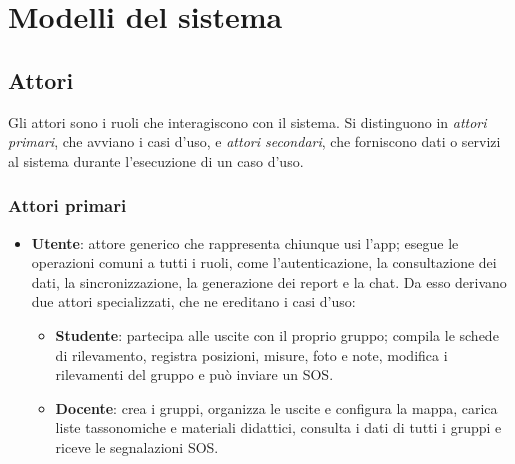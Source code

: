 \section{Modelli del sistema}

\newcommand{\attore}[3]{%
  \begin{scope}[shift={(#2)}]
    \draw[thick] (0,0.62) circle (0.17);
    \draw[thick] (0,0.45) -- (0,0) (-0.3,0.3) -- (0.3,0.3) (0,0) -- (-0.22,-0.35) (0,0) -- (0.22,-0.35);
    \node[font=\small, align=center, below] at (0,-0.38) {#3};
    \coordinate (#1) at (0,0.2);
    \coordinate (#1-alto) at (0,0.85);
    \coordinate (#1-basso) at (0,-1.0);
  \end{scope}}

\subsection{Attori}
Gli attori sono i ruoli che interagiscono con il sistema. Si distinguono in \emph{attori primari}, che avviano i casi d'uso, e \emph{attori secondari}, che forniscono dati o servizi al sistema durante l'esecuzione di un caso d'uso.

\subsubsection*{Attori primari}
\begin{itemize}
    \item \textbf{Utente}: attore generico che rappresenta chiunque usi l'app; esegue le operazioni comuni a tutti i ruoli, come l'autenticazione, la consultazione dei dati, la sincronizzazione, la generazione dei report e la chat. Da esso derivano due attori specializzati, che ne ereditano i casi d'uso:
    \begin{itemize}
        \item \textbf{Studente}: partecipa alle uscite con il proprio gruppo; compila le schede di rilevamento, registra posizioni, misure, foto e note, modifica i rilevamenti del gruppo e può inviare un SOS.
        \item \textbf{Docente}: crea i gruppi, organizza le uscite e configura la mappa, carica liste tassonomiche e materiali didattici, consulta i dati di tutti i gruppi e riceve le segnalazioni SOS.
    \end{itemize}
\end{itemize}

